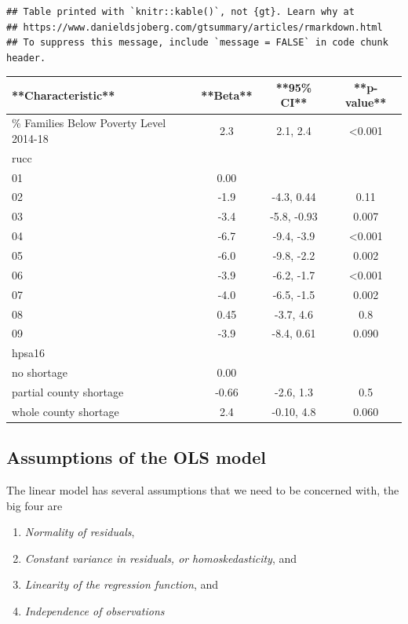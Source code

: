 \documentclass[
]{article}
\providecommand{\tightlist}{%
  \setlength{\itemsep}{0pt}\setlength{\parskip}{0pt}}
\begin{document}
\begin{verbatim}
## Table printed with `knitr::kable()`, not {gt}. Learn why at
## https://www.danieldsjoberg.com/gtsummary/articles/rmarkdown.html
## To suppress this message, include `message = FALSE` in code chunk header.
\end{verbatim}

\begin{tabular}{l|c|c|c}
\hline
**Characteristic** & **Beta** & **95\% CI** & **p-value**\\
\hline
\% Families Below Poverty Level 2014-18 & 2.3 & 2.1, 2.4 & <0.001\\
\hline
rucc &  &  & \\
\hline
01 & 0.00 &  & \\
\hline
02 & -1.9 & -4.3, 0.44 & 0.11\\
\hline
03 & -3.4 & -5.8, -0.93 & 0.007\\
\hline
04 & -6.7 & -9.4, -3.9 & <0.001\\
\hline
05 & -6.0 & -9.8, -2.2 & 0.002\\
\hline
06 & -3.9 & -6.2, -1.7 & <0.001\\
\hline
07 & -4.0 & -6.5, -1.5 & 0.002\\
\hline
08 & 0.45 & -3.7, 4.6 & 0.8\\
\hline
09 & -3.9 & -8.4, 0.61 & 0.090\\
\hline
hpsa16 &  &  & \\
\hline
no shortage & 0.00 &  & \\
\hline
partial county shortage & -0.66 & -2.6, 1.3 & 0.5\\
\hline
whole county shortage & 2.4 & -0.10, 4.8 & 0.060\\
\hline
\end{tabular}

\hypertarget{assumptions-of-the-ols-model}{%
\subsection{Assumptions of the OLS model}\label{assumptions-of-the-ols-model}}

The linear model has several assumptions that we need to be concerned with, the big four are

\begin{enumerate}
\def\labelenumi{\arabic{enumi})}
\tightlist
\item
  \emph{Normality of residuals},
\item
  \emph{Constant variance in residuals, or} \emph{\emph{homoskedasticity}}, and
\item
  \emph{Linearity of the regression function}, and
\item
  \emph{Independence of observations}
\end{enumerate}
\end{document}

